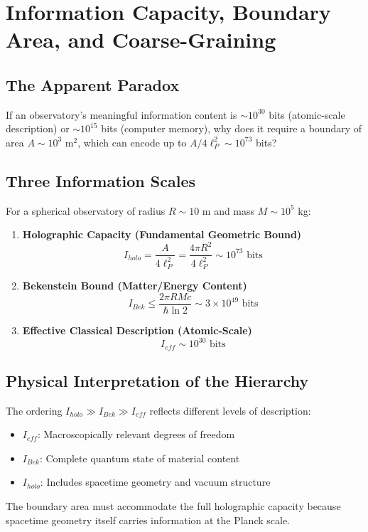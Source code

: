 ﻿\documentclass[12pt]{article}
\begin{document}
\section{Information Capacity, Boundary Area, and Coarse-Graining}


\subsection*{The Apparent Paradox}
If an observatory's meaningful information content is $\sim 10^{30}$ bits (atomic-scale description) or $\sim 10^{15}$ bits (computer memory), why does it require a boundary of area $A \sim 10^3 \text{ m}^2$, which can encode up to $A / 4 \ell_P^2 \sim 10^{73}$ bits?


\subsection*{Three Information Scales}
For a spherical observatory of radius $R \sim 10$ m and mass $M \sim 10^5$ kg:


\begin{enumerate}
    \item \textbf{Holographic Capacity (Fundamental Geometric Bound)}
    \[
    I_{holo} = \frac{A}{4\ell_P^2} = \frac{4\pi R^2}{4\ell_P^2} \sim 10^{73} \text{ bits}
    \]


    \item \textbf{Bekenstein Bound (Matter/Energy Content)}
    \[
    I_{Bek} \leq \frac{2\pi R M c}{\hbar \ln 2} \sim 3 \times 10^{49} \text{ bits}
    \]


    \item \textbf{Effective Classical Description (Atomic-Scale)}
    \[
    I_{eff} \sim 10^{30} \text{ bits}
    \]
\end{enumerate}


\subsection*{Physical Interpretation of the Hierarchy}
The ordering $I_{holo} \gg I_{Bek} \gg I_{eff}$ reflects different levels of description:
\begin{itemize}
    \item $I_{eff}$: Macroscopically relevant degrees of freedom
    \item $I_{Bek}$: Complete quantum state of material content
    \item $I_{holo}$: Includes spacetime geometry and vacuum structure
\end{itemize}
The boundary area must accommodate the full holographic capacity because spacetime geometry itself carries information at the Planck scale.
\end{document}
